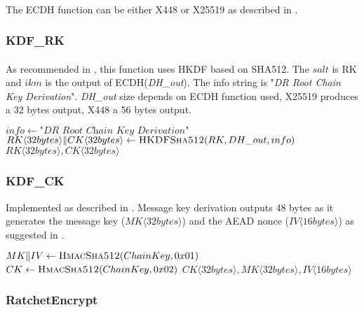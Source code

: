 \documentclass[a4paper,11pt]{article}
\begin{document}
      \paragraph{}The ECDH function can be either X448 or X25519 as described in \cite{rfc7748}.
    \subsubsection{KDF\_RK}
      \paragraph{}As recommended in \cite[section 5.2]{doubleRatchet}, this function uses HKDF\cite{rfc5869} based on SHA512. The $salt$ is RK and $ikm$ is the output of ECDH(\textit{DH\_out}). The info string is "\textit{DR Root Chain Key Derivation}". \textit{DH\_out} size depends on ECDH function used, X25519 produces a 32 bytes output, X448 a 56 bytes output.

      \begin{algorithmic}
          \State $info \gets \textit{"DR Root Chain Key Derivation"}$
          \State $RK\langle 32bytes\rangle\Arrowvert CK\langle 32bytes\rangle \gets \Call{HKDFSha512}{RK, DH\_out, info}$
          \State \Return $RK\langle 32bytes\rangle , CK\langle 32bytes\rangle$
        \EndFunction
      \end{algorithmic}
    \subsubsection{KDF\_CK}
      \label{subsubsec:kdfck}
      Implemented as described in \cite[section 5.2]{doubleRatchet}. Message key derivation outputs 48 bytes as it generates the message key ($MK\langle 32bytes\rangle$) and the AEAD nonce ($IV\langle 16 bytes\rangle$) as suggested in \cite[section 3.1 - ENCRYPT]{doubleRatchet}.
      \begin{algorithmic}
          \State $MK\Arrowvert IV \gets \Call{HmacSha512}{ChainKey, 0x01}$
          \State $CK \gets \Call{HmacSha512}{ChainKey, 0x02}$
          \State \Return $CK\langle 32bytes\rangle ,MK\langle 32bytes\rangle ,IV\langle 16 bytes\rangle $
        \EndFunction
      \end{algorithmic}

    \subsubsection{RatchetEncrypt}
\end{document}
